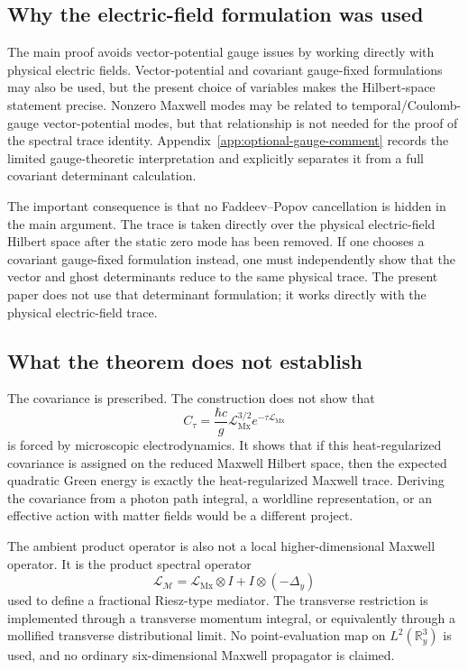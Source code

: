 \documentclass[11pt]{article}
\providecommand{\R}{\mathbb{R}}
\providecommand{\hbarc}{\hbar c}
\providecommand{\LMx}{\mathcal L_{\mathrm{Mx}}}
\providecommand{\Lamb}{\mathcal L_{\mathcal M}}
\providecommand{\Ctau}{C_{\tau}}
\numberwithin{equation}{section}
\begin{document}
\subsection{Why the electric-field formulation was used}
\label{subsec:why-electric-field-formulation}

The main proof avoids vector-potential gauge issues by working directly with
physical electric fields.  Vector-potential and covariant gauge-fixed
formulations may also be used, but the present choice of variables makes the
Hilbert-space statement precise.  Nonzero Maxwell modes may be related to
temporal/Coulomb-gauge vector-potential modes, but that relationship is not
needed for the proof of the spectral trace identity.
Appendix~\ref{app:optional-gauge-comment} records the limited gauge-theoretic
interpretation and explicitly separates it from a full covariant determinant
calculation.

The important consequence is that no Faddeev--Popov cancellation is hidden in
the main argument.  The trace is taken directly over the physical electric-field
Hilbert space after the static zero mode has been removed.  If one chooses a
covariant gauge-fixed formulation instead, one must independently show that the
vector and ghost determinants reduce to the same physical trace.  The present
paper does not use that determinant formulation; it works directly with the
physical electric-field trace.

\subsection{What the theorem does not establish}
\label{subsec:what-the-theorem-does-not-establish}

The covariance is prescribed.  The construction does not show that
\[
    \Ctau=\frac{\hbarc}{g}\LMx^{3/2}e^{-\tau\LMx}
\]
is forced by microscopic electrodynamics.  It shows that if this
heat-regularized covariance is assigned on the reduced Maxwell Hilbert space,
then the expected quadratic Green energy is exactly the heat-regularized
Maxwell trace.  Deriving the covariance from a photon path integral, a
worldline representation, or an effective action with matter fields would be a
different project.

The ambient product operator is also not a local higher-dimensional Maxwell
operator.  It is the product spectral operator
\[
    \Lamb=\LMx\otimes I+I\otimes(-\Delta_y)
\]
used to define a fractional Riesz-type mediator.  The transverse restriction is
implemented through a transverse momentum integral, or equivalently through a
mollified transverse distributional limit.  No point-evaluation map on
\(L^2(\R^3_y)\) is used, and no ordinary six-dimensional Maxwell propagator is
claimed.
\end{document}
